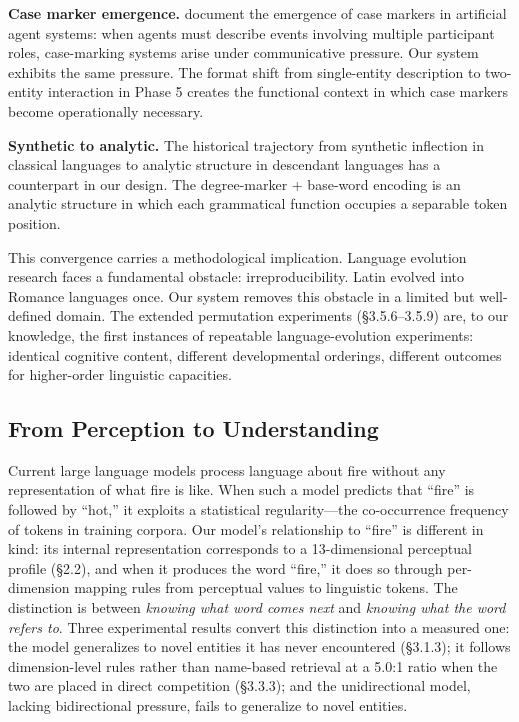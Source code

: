 \documentclass{article}
\begin{document}
\textbf{Case marker emergence.} \citet{steels2012} document the emergence of case markers in artificial agent systems: when agents must describe events involving multiple participant roles, case-marking systems arise under communicative pressure. Our system exhibits the same pressure. The format shift from single-entity description to two-entity interaction in Phase 5 creates the functional context in which case markers become operationally necessary.

\textbf{Synthetic to analytic.} The historical trajectory from synthetic inflection in classical languages to analytic structure in descendant languages has a counterpart in our design. The degree-marker + base-word encoding is an analytic structure in which each grammatical function occupies a separable token position.

This convergence carries a methodological implication. Language evolution research faces a fundamental obstacle: irreproducibility. Latin evolved into Romance languages once. Our system removes this obstacle in a limited but well-defined domain. The extended permutation experiments (\S3.5.6--3.5.9) are, to our knowledge, the first instances of repeatable language-evolution experiments: identical cognitive content, different developmental orderings, different outcomes for higher-order linguistic capacities.

\subsection{From Perception to Understanding}

Current large language models process language about fire without any representation of what fire is like. When such a model predicts that ``fire'' is followed by ``hot,'' it exploits a statistical regularity---the co-occurrence frequency of tokens in training corpora. Our model's relationship to ``fire'' is different in kind: its internal representation corresponds to a 13-dimensional perceptual profile (\S2.2), and when it produces the word ``fire,'' it does so through per-dimension mapping rules from perceptual values to linguistic tokens. The distinction is between \emph{knowing what word comes next} and \emph{knowing what the word refers to}. Three experimental results convert this distinction into a measured one: the model generalizes to novel entities it has never encountered (\S3.1.3); it follows dimension-level rules rather than name-based retrieval at a 5.0:1 ratio when the two are placed in direct competition (\S3.3.3); and the unidirectional model, lacking bidirectional pressure, fails to generalize to novel entities.
\end{document}
